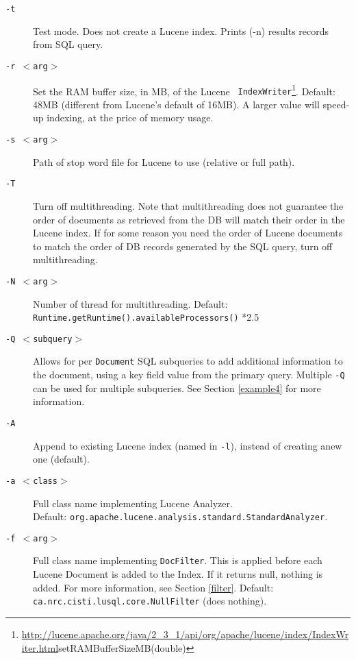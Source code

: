 \begin{description}
\item [\tt -t] Test mode. Does not create a Lucene index. 
  Prints (-n) results records from SQL query.


\item [\tt -r $<$arg$>$] Set the RAM buffer size, in MB, of the Lucene {\tt
    IndexWriter}\footnote{\url{http://lucene.apache.org/java/2_3_1/api/org/apache/lucene/index/IndexWriter.html}{setRAMBufferSizeMB(double)}}. 
  Default: 48MB
  (different from Lucene's default of 16MB).
  A larger value will speed-up indexing, at the price of memory usage.


\item [\tt -s $<$arg$>$] Path of stop word file for Lucene to use (relative or full path).


\item [\tt -T]                   Turn off multithreading. Note that multithreading
  does not guarantee the order of documents as retrieved from the DB will
  match their order in the Lucene index.
  If for some reason you need the order of Lucene documents to match the
  order of DB records generated by the SQL query, turn off multithreading.




\item [\tt -N $<$arg$>$] Number of thread for multithreading. Default:\\
  {\tt Runtime.getRuntime().availableProcessors()} *2.5


\item[\tt -Q $<$subquery$>$] Allows for per {\tt Document} SQL subqueries to add additional information
  to the document, using a key field value from the primary query.
  Multiple {\tt -Q} can be used for multiple subqueries.
  See Section \ref{example4} for more information.
  

\item[\tt -A] Append to existing Lucene index (named in {\tt -l}), instead of
  creating anew one (default).


\item[\tt -a $<$class$>$] Full class name implementing Lucene Analyzer. \\
  Default: 
  {\tt org.apache.lucene.analysis.standard.StandardAnalyzer}.


\item[\tt -f $<$arg$>$]   Full class name implementing {\tt DocFilter}. 
  This is applied before each Lucene Document is added to the Index. If it returns null, nothing is added.
  For more information, see Section \ref{filter}.
  Default: {\tt ca.nrc.cisti.lusql.core.NullFilter} (does nothing).



\end{description}
